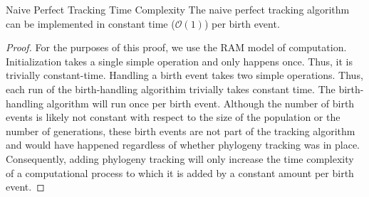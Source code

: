 \begin{theorem}{Naive Perfect Tracking Time Complexity}
\label{thm:perfect-tracking-time}
The naive perfect tracking algorithm can be implemented in constant time ($\mathcal{O}(1)$) per birth event.
\end{theorem}

\begin{proof}
\label{prf:perfect-tracking-time}
For the purposes of this proof, we use the RAM model of computation. 
Initialization takes a single simple operation and only happens once. 
Thus, it is trivially constant-time.
Handling a birth event takes two simple operations.
Thus, each run of the birth-handling algorithim trivially takes constant time.
The birth-handling algorithm will run once per birth event.
Although the number of birth events is likely not constant with respect to the size of the population or the number of generations,
these birth events are not part of the tracking algorithm and would have happened regardless of whether phylogeny tracking was in place.
Consequently, adding phylogeny tracking will only increase the time complexity of a computational process to which it is added by a constant amount per birth event.
\end{proof}

